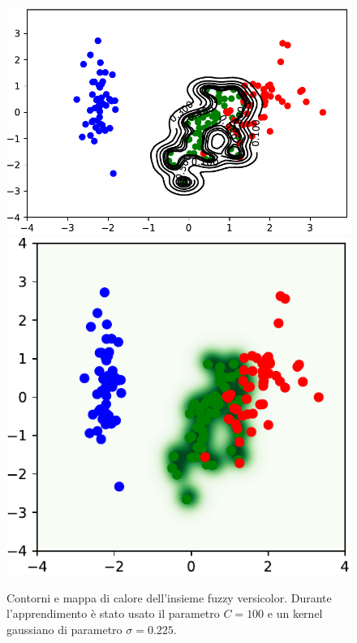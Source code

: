 \documentclass [11pt,a4paper,twoside,openright] {book}
\begin{document}
\begin{figure}[!h]
        \centering%
        \subfigure
          {\includegraphics[scale=.5]{figure/versicolormap.pdf}}\qquad\qquad
       \subfigure
          {\includegraphics[scale=.5]{figure/versicolorheat.pdf}}
          \caption{Contorni e mappa di calore dell'insieme fuzzy versicolor. Durante l'apprendimento è stato usato il parametro $C=100$ e un kernel gaussiano di parametro $\sigma=0.225$.\label{fuzzyversicolor}}
\end{figure}
\end{document}
